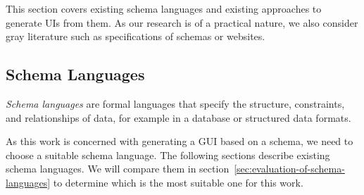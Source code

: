 
This section covers existing schema languages and existing approaches to generate UIs from them.
As our research is of a practical nature, we also consider gray literature such as specifications of schemas or websites.
\subsection{Schema Languages}\label{subsec:schemalanguages}

\textit{Schema languages} are formal languages that specify the structure, constraints, and relationships of data, for example in a database or structured data formats.

As this work is concerned with generating a GUI based on a schema, we need to choose a suitable schema language.
The following sections describe existing schema languages.
We will compare them in section~\ref{sec:evaluation-of-schema-languages} to determine which is the most suitable one for this work.
